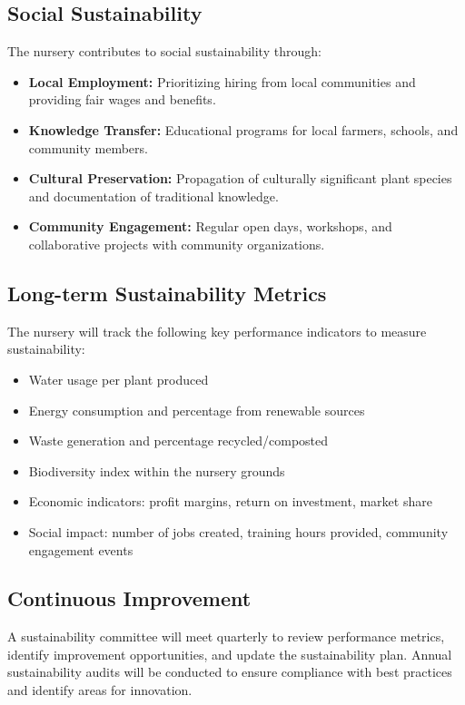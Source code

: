 \subsection{Social Sustainability}

The nursery contributes to social sustainability through:

\begin{itemize}
    \item \textbf{Local Employment:} Prioritizing hiring from local communities and providing fair wages and benefits.
    
    \item \textbf{Knowledge Transfer:} Educational programs for local farmers, schools, and community members.
    
    \item \textbf{Cultural Preservation:} Propagation of culturally significant plant species and documentation of traditional knowledge.
    
    \item \textbf{Community Engagement:} Regular open days, workshops, and collaborative projects with community organizations.
\end{itemize}

\subsection{Long-term Sustainability Metrics}

The nursery will track the following key performance indicators to measure sustainability:

\begin{itemize}
    \item Water usage per plant produced
    \item Energy consumption and percentage from renewable sources
    \item Waste generation and percentage recycled/composted
    \item Biodiversity index within the nursery grounds
    \item Economic indicators: profit margins, return on investment, market share
    \item Social impact: number of jobs created, training hours provided, community engagement events
\end{itemize}

\subsection{Continuous Improvement}

A sustainability committee will meet quarterly to review performance metrics, identify improvement opportunities, and update the sustainability plan. Annual sustainability audits will be conducted to ensure compliance with best practices and identify areas for innovation. 